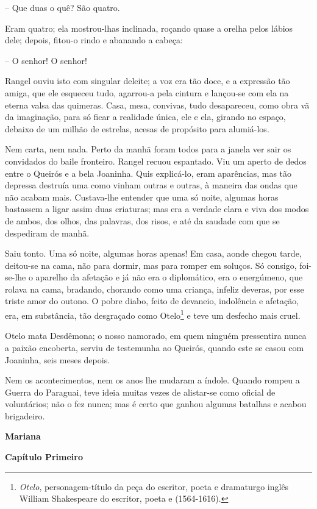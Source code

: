 -- Que duas o quê? São quatro.

Eram quatro; ela mostrou-lhas inclinada, roçando quase a orelha pelos
lábios dele; depois, fitou-o rindo e abanando a cabeça:

-- O senhor! O senhor!

Rangel ouviu isto com singular deleite; a voz era tão doce, e a
expressão tão amiga, que ele esqueceu tudo, agarrou-a pela cintura e
lançou-se com ela na eterna valsa das quimeras. Casa, mesa, convivas,
tudo desapareceu, como obra vã da imaginação, para só ficar a realidade
única, ele e ela, girando no espaço, debaixo de um milhão de estrelas,
acesas de propósito para alumiá-los.

Nem carta, nem nada. Perto da manhã foram todos para a janela ver sair
os convidados do baile fronteiro. Rangel recuou espantado. Viu um aperto
de dedos entre o Queirós e a bela Joaninha. Quis explicá-lo, eram
aparências, mas tão depressa destruía uma como vinham outras e outras, à
maneira das ondas que não acabam mais. Custava-lhe entender que uma só
noite, algumas horas bastassem a ligar assim duas criaturas; mas era a
verdade clara e viva dos modos de ambos, dos olhos, das palavras, dos
risos, e até da saudade com que se despediram de manhã.

Saiu tonto. Uma só noite, algumas horas apenas! Em casa, aonde chegou
tarde, deitou-se na cama, não para dormir, mas para romper em soluços.
Só consigo, foi-se-lhe o aparelho da afetação e já não era o
diplomático, era o energúmeno, que rolava na cama, bradando, chorando
como uma criança, infeliz deveras, por esse triste amor do outono. O
pobre diabo, feito de devaneio, indolência e afetação, era, em
substância, tão desgraçado como Otelo\footnote{\emph{Otelo},
  personagem-título da peça do escritor, poeta e dramaturgo inglês
  William Shakespeare do escritor, poeta e (1564-1616).} e teve um
desfecho mais cruel.

Otelo mata Desdêmona; o nosso namorado, em quem ninguém pressentira
nunca a paixão encoberta, serviu de testemunha ao Queirós, quando este
se casou com Joaninha, seis meses depois.

Nem os acontecimentos, nem os anos lhe mudaram a índole. Quando rompeu a
Guerra do Paraguai, teve ideia muitas vezes de alistar-se como oficial
de voluntários; não o fez nunca; mas é certo que ganhou algumas batalhas
e acabou brigadeiro.

\textbf{Mariana}

\textbf{Capítulo Primeiro}

